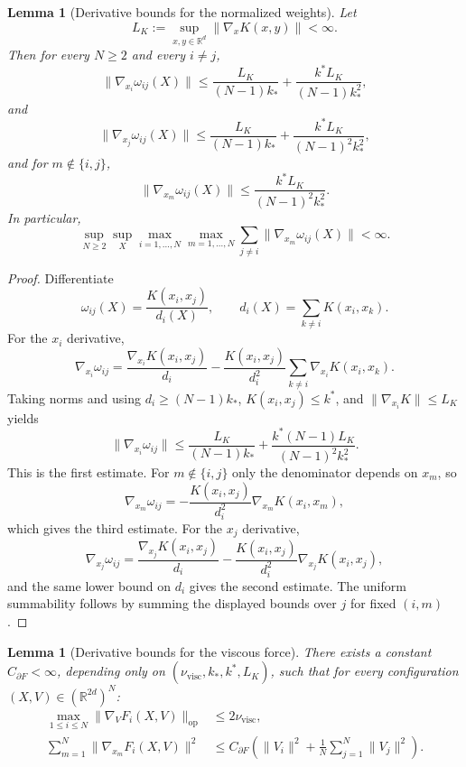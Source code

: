 \documentclass[11pt]{article}
\newtheorem{lemma}[theorem]{Lemma}
\theoremstyle{definition}
\theoremstyle{remark}
\newcommand{\R}{\mathbb{R}}
\begin{document}
\begin{lemma}[Derivative bounds for the normalized weights]\label{lem:weight-deriv}
Let
\[
L_K:=\sup_{x,y\in \R^d}\|\nabla_x K(x,y)\|<\infty.
\]
Then for every $N\geq2$ and every $i\neq j$,
\[
\|\nabla_{x_i}\omega_{ij}(X)\|
\leq
\frac{L_K}{(N-1)k_*}
+\frac{k^*L_K}{(N-1)k_*^2},
\]
and
\[
\|\nabla_{x_j}\omega_{ij}(X)\|
\leq
\frac{L_K}{(N-1)k_*}
+\frac{k^*L_K}{(N-1)^2k_*^2},
\]
and for $m\notin\{i,j\}$,
\[
\|\nabla_{x_m}\omega_{ij}(X)\|
\leq
\frac{k^*L_K}{(N-1)^2k_*^2}.
\]
In particular,
\[
\sup_{N\geq2}\sup_X \max_{i=1,\dots,N}\max_{m=1,\dots,N}
\sum_{j\neq i}\|\nabla_{x_m}\omega_{ij}(X)\|
<\infty.
\]
\end{lemma}

\begin{proof}
Differentiate
\[
\omega_{ij}(X)=\frac{K(x_i,x_j)}{d_i(X)},
\qquad
d_i(X)=\sum_{k\neq i}K(x_i,x_k).
\]
For the $x_i$ derivative,
\[
\nabla_{x_i}\omega_{ij}
=
\frac{\nabla_{x_i}K(x_i,x_j)}{d_i}
-\frac{K(x_i,x_j)}{d_i^2}
\sum_{k\neq i}\nabla_{x_i}K(x_i,x_k).
\]
Taking norms and using $d_i\geq (N-1)k_*$,
$K(x_i,x_j)\leq k^*$, and
$\|\nabla_{x_i}K\|\leq L_K$ yields
\[
\|\nabla_{x_i}\omega_{ij}\|
\leq
\frac{L_K}{(N-1)k_*}
+\frac{k^*(N-1)L_K}{(N-1)^2k_*^2}.
\]
This is the first estimate. For $m\notin\{i,j\}$ only the denominator depends on
$x_m$, so
\[
\nabla_{x_m}\omega_{ij}
=
-\frac{K(x_i,x_j)}{d_i^2}\nabla_{x_m}K(x_i,x_m),
\]
which gives the third estimate. For the $x_j$ derivative,
\[
\nabla_{x_j}\omega_{ij}
=
\frac{\nabla_{x_j}K(x_i,x_j)}{d_i}
-\frac{K(x_i,x_j)}{d_i^2}\nabla_{x_j}K(x_i,x_j),
\]
and the same lower bound on $d_i$ gives the second estimate. The uniform summability follows by summing the
displayed bounds over $j$ for fixed $(i,m)$.
\end{proof}

\begin{lemma}[Derivative bounds for the viscous force]\label{lem:force-deriv}
There exists a constant $C_{\partial F}<\infty$, depending only on
$(\nu_{\mathrm{visc}},k_*,k^*,L_K)$, such that for every configuration
$(X,V)\in(\R^{2d})^N$:
\begin{align}
\max_{1\leq i\leq N}\|\nabla_V F_i(X,V)\|_{\mathrm{op}}
&\leq
2\nu_{\mathrm{visc}},
\label{eq:force-v-deriv}\\
\sum_{m=1}^N \|\nabla_{x_m}F_i(X,V)\|^2
&\leq
C_{\partial F}
\left(
\|V_i\|^2+\frac1N\sum_{j=1}^N \|V_j\|^2
\right).
\label{eq:force-x-deriv}
\end{align}
\end{lemma}
\end{document}
